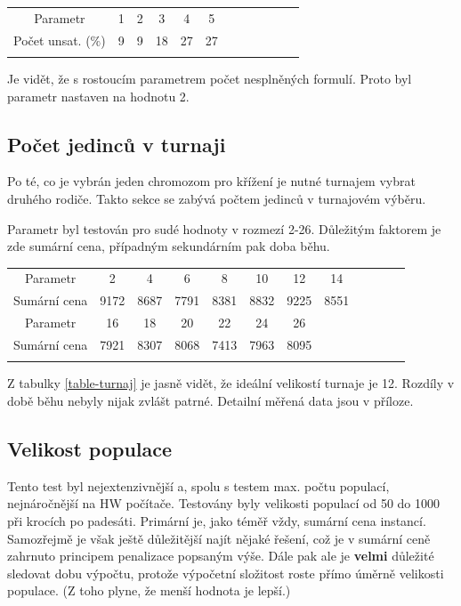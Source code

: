 \documentclass[a4paper]{article}
\begin{document}
			\begin{tabular}{cccccccccccc} \label{table-nesplnena}
			\\
			Parametr & 1 & 2 & 3 & 4 & 5 \\
			Počet unsat. ($\%$) & 9 & 9 & 18 & 27 & 27\\
			\\
			\end{tabular}
			
			Je vidět, že s rostoucím parametrem počet nesplněných formulí. Proto byl parametr nastaven na hodnotu 2.
		
	\subsection{Počet jedinců v turnaji}
		Po té, co je vybrán jeden chromozom pro křížení je nutné turnajem vybrat druhého rodiče. Takto sekce se zabývá počtem jedinců v turnajovém výběru.
		
		Parametr byl testován pro sudé hodnoty v rozmezí 2-26. Důležitým faktorem je zde sumární cena, případným sekundárním pak doba běhu.
		
		\begin{tabular}{cccccccccccc} \label{table-turnaj}
			\\
			Parametr & 2 & 4 & 6 & 8 & 10 & 12 & 14\\
			Sumární cena & 9172 & 8687 & 7791 & 8381 & 8832 & 9225 & 8551\\
			\hline
			Parametr & 16 & 18 & 20 & 22 & 24 & 26 \\
			Sumární cena & 7921 & 8307 & 8068 & 7413 & 7963 & 8095\\
			\\
			\end{tabular}
		
		Z tabulky \ref{table-turnaj} je jasně vidět, že ideální velikostí turnaje je 12. Rozdíly v době běhu nebyly nijak zvlášt patrné. Detailní měřená data jsou v příloze.
	
	\subsection{Velikost populace}
		Tento test byl nejextenzivnější a, spolu s testem max. počtu populací, nejnáročnější na HW počítače. Testovány byly velikosti populací od 50 do 1000 při krocích po padesáti. Primární je, jako téměř vždy, sumární cena instancí. Samozřejmě je však ještě důležitější najít nějaké řešení, což je v sumární ceně zahrnuto principem penalizace popsaným výše. Dále pak ale je \textbf{velmi} důležité sledovat dobu výpočtu, protože výpočetní složitost roste přímo úměrně velikosti populace. (Z toho plyne, že menší hodnota je lepší.)
		
\end{document}
